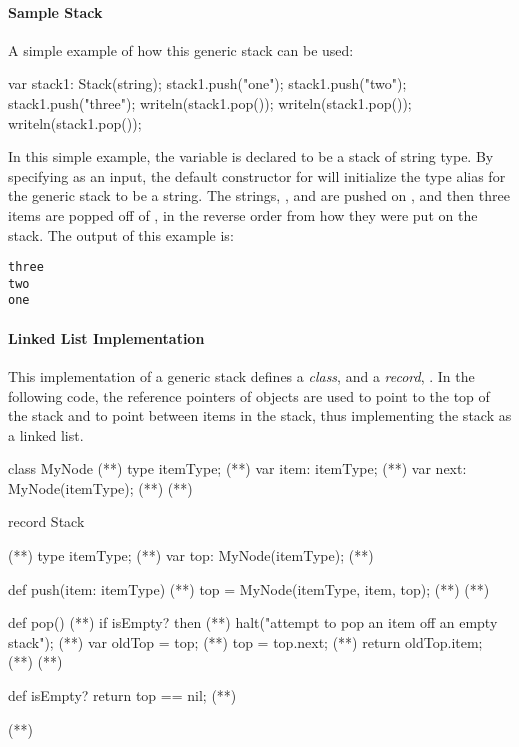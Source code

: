 \paragraph{Sample Stack}
A simple example of how this generic stack can be used:
\begin{chapel}
var stack1: Stack(string);
stack1.push("one");
stack1.push("two");
stack1.push("three");
writeln(stack1.pop());
writeln(stack1.pop());
writeln(stack1.pop());
\end{chapel}
In this simple example, the variable  is declared to be a
stack of string type.
By specifying  as an input, the default constructor for 
will initialize the type alias for the generic stack to be a string.
The strings, ,  and 
are pushed on , and then three items are popped off of ,
in the reverse order from how they were put on the stack.
The output of this example is:
{\small
\begin{verbatim}
three
two
one
\end{verbatim}}

\paragraph{Linked List Implementation}
This implementation of a generic stack defines a {\em class},
 and a {\em record}, .  In the following
code, the reference pointers of  objects are used to point to
the top of the stack and to point between items in the stack,
thus implementing the stack as a linked list.

\begin{numberedchapel}
class MyNode {                      (*\label{mynode_class_start}*)
  type itemType;                    (*\label{mynode_itemtype}*)
  var item: itemType;               (*\label{mynode_item}*)
  var next: MyNode(itemType);       (*\label{mynode_next}*)
}                                   (*\label{mynode_class_end}*)

record Stack {                      (*\label{stack_list_start}*)
  type itemType;                    (*\label{stack_list_itemtype}*)
  var top: MyNode(itemType);        (*\label{stack_list_top}*)

  def push(item: itemType) {        (*\label{stack_list_push_start}*)
    top = MyNode(itemType, item, top); (*\label{stack_list_push_top}*)
  }                                 (*\label{stack_list_push_end}*)

  def pop() {                       (*\label{stack_list_pop_start}*)
    if isEmpty? then                (*\label{stack_list_pop_empty_1}*)
      halt("attempt to pop an item off an empty stack"); (*\label{stack_list_empty_2}*)
    var oldTop = top;               (*\label{stack_list_pop_oldtop}*)
    top = top.next;                 (*\label{stack_list_pop_newtop}*)
    return oldTop.item;             (*\label{stack_list_pop_return}*)
  }                                 (*\label{stack_list_pop_end}*)

  def isEmpty? return top == nil;   (*\label{stack_list_isempty}*)
}                                  (*\label{stack_list_end}*)
\end{numberedchapel}

